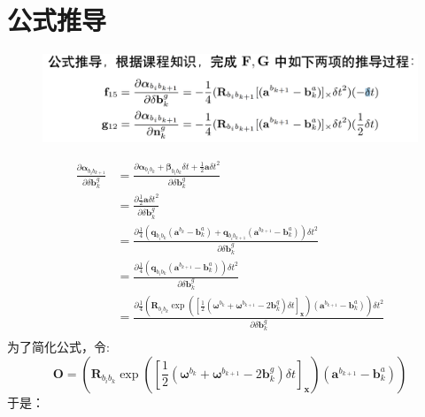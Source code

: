 \documentclass[oneside]{article}
\begin{document}
\section{公式推导}
\begin{figure}[htbp]
    \centering
    \includegraphics[width=.8\linewidth]{figures/fig3.png}    
\end{figure}
\begin{align}
    \frac{\partial \boldsymbol{\alpha}_{b_{i} b_{k+1}}}{\partial \delta \mathbf{b}_{k}^{g}}    
 &= \frac{\partial\boldsymbol{\alpha}_{b_{i} b_{k}}+\boldsymbol{\beta}_{b_{i} b_{k}} \delta t+\frac{1}{2} \mathbf{a} \delta t^{2}}{\partial \delta \mathbf{b}_{k}^{g}} \\
 &= \frac{\partial\frac{1}{2} \mathbf{a} \delta t^{2}}{\partial \delta \mathbf{b}_{k}^{g}} \\
 &= \frac{\partial\frac{1}{4}\left(\mathbf{q}_{b_{i} b_{k}}\left({\mathbf{a}}^{b_{k}}-\mathbf{b}_{k}^{a}\right)+\mathbf{q}_{b_{i} b_{k+1}}\left({\mathbf{a}}^{b_{k+1}}-\mathbf{b}_{k}^{a}\right)\right) \delta t^2}{\partial \delta \mathbf{b}_{k}^{g}} \\
 &= \frac{\partial\frac{1}{4}\left(\mathbf{q}_{b_{i} b_{k}}\left({\mathbf{a}}^{b_{k+1}}-\mathbf{b}_{k}^{a}\right)\right) \delta t^2}{\partial \delta \mathbf{b}_{k}^{g}} \\
 &= \frac{\partial\frac{1}{4}\left(\mathbf{R}_{b_{i} b_{k}}
\exp \left( \left[ \frac{1}{2}(\mathbf{\omega}^{b_k} + \mathbf{\omega}^{b_{k + 1}} - 2\mathbf{b}_k^g) \delta t \right]_{\mathbf{x}} \right)
 \left({\mathbf{a}}^{b_{k+1}}-\mathbf{b}_{k}^{a}\right)\right) \delta t^2}{\partial \delta \mathbf{b}_{k}^{g}} \\
\end{align} 
为了简化公式，令:
\begin{equation}
    \mathbf{O} = \left(\mathbf{R}_{b_{i} b_{k}}
    \exp \left( \left[ \frac{1}{2}(\mathbf{\omega}^{b_k} + \mathbf{\omega}^{b_{k + 1}} - 2\mathbf{b}_k^g) \delta t \right]_{\mathbf{x}} \right)
     \left({\mathbf{a}}^{b_{k+1}}-\mathbf{b}_{k}^{a}\right)\right)  
\end{equation}
于是：
\end{document}
